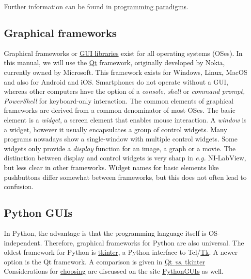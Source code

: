 Further information can be found in \href{https://en.wikipedia.org/wiki/Comparison_of_programming_paradigms}{programming paradigms}.

\subsection{Graphical frameworks}

Graphical frameworks or \href{https://en.wikipedia.org/wiki/List_of_platform-independent_GUI_libraries}{GUI libraries} exist for all operating systems (OSes). In this manual, we will use the \href{https://en.wikipedia.org/wiki/Qt_(software)}{Qt} framework, originally developed by Nokia, currently owned by Microsoft. This framework exists for Windows, Linux, MacOS and also for Android and iOS. Smartphones do not operate without a GUI, whereas other computers have the option of a \emph{console, shell} or \emph{command prompt, PowerShell} for keyboard-only interaction.
The common elements of graphical frameworks are derived from a common denominator of most OSes. The basic element is a \emph{widget}, a screen element that enables mouse interaction.
A \emph{window} is a widget, however it usually encapsulates a group of control widgets. Many programs nowadays show a single-window with multiple control widgets. Some widgets only provide a \emph{display} function for an image, a graph or a movie. The distinction between display and control widgets is very sharp in \emph{e.g.} NI-LabView, but less clear in other frameworks. Widget names for basic elements like pushbuttons differ somewhat between frameworks, but this does not often lead to confusion.

\subsection{Python GUIs}

In Python, the advantage is that the programming language itself is OS-independent. Therefore, graphical frameworks for Python are also universal. The oldest framework for Python is \textsf{\href{https://docs.python.org/3/library/tkinter.html}{tkinter}}, a Python interface to \textsf{Tcl/\href{https://en.wikipedia.org/wiki/Tk_(software)}{Tk}}. A newer option is the Qt framework. A comparison is given in  \href{https://www.pythonguis.com/faq/pyqt-vs-tkinter/}{Qt \emph{vs.} tkinter} Considerations for \href{https://www.pythonguis.com/faq/which-python-gui-library/}{choosing} are discussed on the site \href{https://www.pythonguis.com/}{PythonGUIs} as well.

